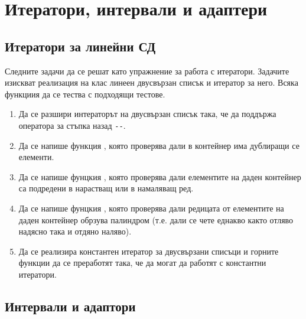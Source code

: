 \section {Итератори, интервали и адаптери}
\subsection {Итератори за линейни СД}
\label{iterators1}
Следните задачи да се решат като упражнение за работа с итератори. Задачите изискват реализация на клас линеен двусвързан списък и  итератор за него. Всяка функциия да се тества с подходящи тестове.


\begin{enumerate}

	\item Да се разшири интераторът на двусвързан списък така, че да поддържа оператора за стъпка назад \texttt{-{}-}.

	\item Да се напише функция , която проверява дали в контейнер има дублиращи се елементи.

	\item Да се напише фунцкия , която проверява дали елементите на даден контейнер са подредени в нарастващ или в намаляващ ред.

	\item Да се напише фунцкия , която проверява дали редицата от елементите на даден контейнер обрзува палиндром (т.е. дали се чете еднакво както отляво надясно така и отдяно наляво).

	\item Да се реализира константен итератор за двусвързани списъци и горните функции да се преработят така, че да могат да работят с константни итератори.

    

\end{enumerate}

\subsection {Интервали и адаптори}

